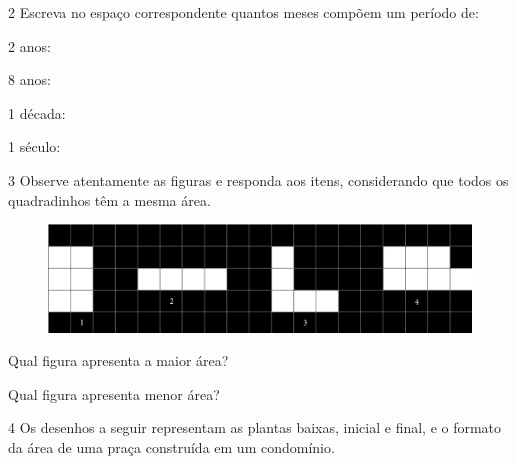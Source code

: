 \num{2} Escreva no espaço correspondente quantos meses compõem um período de:

\begin{escolha}\enlargethispage{2\baselineskip}
\item
  2 anos:

\item
  8 anos:

\item
  1 década:

\item
  1 século:
\end{escolha}


\num{3} Observe atentamente as figuras e responda aos itens, considerando que todos os quadradinhos têm a mesma área.

\begin{figure}[htpb!]
\centering
\includegraphics[width=\textwidth]{media/image31.png}
\end{figure}

\begin{escolha}
\item Qual figura apresenta a maior área?\\

\item Qual figura apresenta menor área? \\
\end{escolha}


\num{4} Os desenhos a seguir representam as plantas baixas, inicial
e final, e o formato da área de uma praça construída em um condomínio. 

